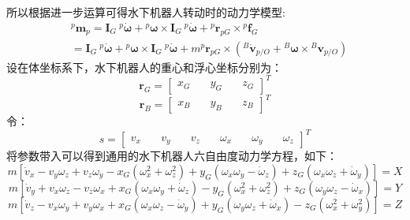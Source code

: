 所以根据进一步运算可得水下机器人转动时的动力学模型:
\begin{equation}
    \begin{aligned} & ^{{p}}\boldsymbol{m}_{{p}}
        =\boldsymbol{I}_{{G}}{~}^{{p}}\dot{\boldsymbol{\omega}}
        +{}^{{p}}\boldsymbol{\omega}\times\boldsymbol{I}_{{G}}{~}^{{p}}\dot{\boldsymbol{\omega}}
        +{}^{{p}}\boldsymbol{r}_{{pG}}\times{}^{{p}}\boldsymbol{f}_{{G}}
        \\ &  =\boldsymbol{I}_{{G}}{~}^{{p}}\dot{\boldsymbol{\omega}}+{}^{{p}}\boldsymbol{\omega}\times\boldsymbol{I}_{{G}}{~}^{{p}}\dot{\boldsymbol{\omega}}
        +m^{{p}}
        \boldsymbol{r}_{{pG}}\times\left(^{{B}}\dot{\boldsymbol{v}}_{{p/}O}+{}^{{B}}\boldsymbol{\omega}\times{}^{{B}}
        \boldsymbol{v}_{{p/}O}\right)\end{aligned}
\end{equation}
设在体坐标系下，水下机器人的重心和浮心坐标分别为：
\begin{equation}
    \boldsymbol{r}_{G}=\begin{bmatrix}x_G\quad&y_G\quad&z_G\end{bmatrix}^T
\end{equation}
\begin{equation}
    \boldsymbol{r}_{B}=\begin{bmatrix}x_B\quad&y_B\quad&z_B\end{bmatrix}^T
\end{equation}
令：
\begin{equation}
    s=\begin{bmatrix}v_{x}\quad&v_{y}\quad&v_{z}\quad&\omega_{x}\quad&\omega_{y}\quad&\omega_{z}\end{bmatrix}^T
\end{equation}
将参数带入可以得到通用的水下机器人六自由度动力学方程，如下：
\begin{equation}
    m[\dot{v}_x-v_y\omega_z+v_z\omega_y-x_G(\omega_x^2+\omega_z^2)+y_G(\omega_x\omega_y-\dot{\omega}_z)
    +z_G(\omega_x\omega_z+\dot{\omega}_y)]=X
\end{equation}
\begin{equation}
    m[\dot{v}_y+v_x\omega_z-v_z\omega_x+x_G(\omega_x\omega_y+\dot{\omega}_z)
    -y_G(\omega_x^2+\omega_z^2)+z_G(\omega_y\omega_z-\dot{\omega}_x)]=Y
\end{equation}
\begin{equation}
    m[\dot{v}_z-v_x\omega_y+v_y\omega_x+x_G(\omega_x\omega_z-\dot{\omega}_y)+
    y_G(\omega_y\omega_z+\dot{\omega}_x)-z_G(\omega_x^2+\omega_y^2)]=Z
\end{equation}
